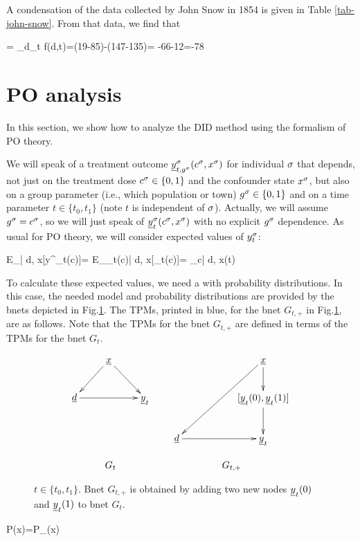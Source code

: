 A condensation of the
data collected by John Snow in 1854
is given in Table \ref{tab-john-snow}.
From that data, we find that

\beq
\delta= \Delta_d\Delta_t f(d,t)=(19-85)-(147-135)=
-66-12=-78
\eeq



\section{PO analysis}
In this section,
we show how
to analyze the
DID method
using the formalism of PO theory.

We will speak of a treatment 
outcome
$\rvy^\s_{t, g^\s}
(c^\s, x^\s)$
for individual $\sigma$
that depends, not 
just on the treatment dose 
$c^\sigma\in \{0,1\}$
and the confounder state $x^\sigma$,
but also
on a group parameter (i.e., which population
or town)
$g^\sigma\in \{0,1\}$
and on a time parameter $t\in\{t_0, t_1\}$ 
(note $t$ is independent of $\sigma$).
Actually,
we will assume $g^\sigma=c^\sigma$,
so we will just speak of
$\rvy^\s_t(c^\s, x^\s)$
with no explicit $g^\sigma$
dependence. As usual for PO theory,
we will consider
expected values of $y^\sigma_t$:


\beq
E_{\s| d, x}[y^\s_t(c)]=
 E_{\rvy_t(c)| d, x}[\rvy_t(c)]=
\caly_{c| d, x}(t)
\eeq

To calculate these
expected values, we need a 
with probability 
distributions.
In this case,
the needed model and probability
distributions are
provided by the
bnets depicted in Fig.\ref{fig-did-G_t-+}.
The TPMs,
printed in blue,
for the 
 bnet
$G_{t, +}$
in Fig.\ref{fig-did-G_t-+},
are as follows.
Note
that the
TPMs for the bnet $G_{t, +}$
are defined in 
terms
of the TPMs for the bnet $G_t$.


\begin{figure}[h!]
$$
\begin{array}{ccccc}
\xymatrix{
&\rvx\ar[dl]\ar[dr]
\\
\rvd\ar[rr]&&\rvy_t
}
&&
\xymatrix{
&&\rvx\ar[d]\ar[ddll]
\\
&&[\rvy_t(0), \rvy_t(1)]
\ar[d]
\\
\rvd\ar[rr]
&&\rvy_t
}
\\
\\
G_t&&G_{t, +}
\end{array}
$$
\caption{$t\in \{t_0, t_1\}$.
Bnet 
$G_{t,+}$
is obtained 
by adding
two new nodes
$\rvy_t(0)$
and $\rvy_t(1)$ to bnet $G_t$.}
\label{fig-did-G_t-+}
\end{figure}

\beq\color{blue}
P(x)=P_{\rvx}(x)
\eeq

